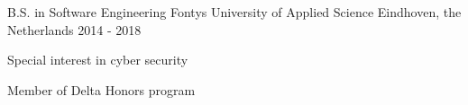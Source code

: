 

\begin{cventries}

  \cventry
    {B.S. in Software Engineering} %
    {Fontys University of Applied Science} %
    {Eindhoven, the Netherlands} %
    {2014 - 2018} %
    {
      \begin{cvitems} %
        \item {Special interest in cyber security}
        \item {Member of Delta Honors program}
      \end{cvitems}
    }

\end{cventries}
